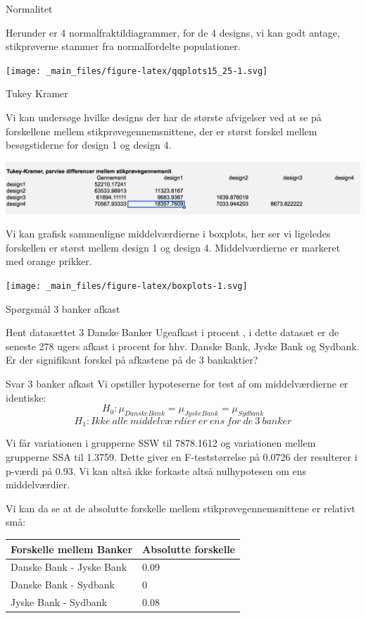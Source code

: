 \documentclass[]{book}
\begin{document}
Normalitet

Herunder er 4 normalfraktildiagrammer, for de 4 designs, vi kan godt antage, stikprøverne stammer fra normalfordelte populationer.

\texttt{[image: \_main\_files/figure-latex/qqplots15\_25-1.svg]}

Tukey Kramer

Vi kan undersøge hvilke designs der har de største afvigelser ved at se på forskellene mellem stikprøvegennemsnittene, der er størst forskel mellem besøgstiderne for design 1 og design 4.

\includegraphics{img/Tukeykramer.png}

Vi kan grafisk sammenligne middelværdierne i boxplots, her ser vi ligeledes forskellen er størst mellem design 1 og design 4. Middelværdierne er markeret med orange prikker.

\texttt{[image: \_main\_files/figure-latex/boxplots-1.svg]}

Spørgsmål 3 banker afkast

Hent datasættet 3 Danske Banker Ugeafkast i procent
, i dette datasæt er de seneste 278 ugers afkast i procent for hhv. Danske Bank, Jyske Bank og Sydbank. Er der signifikant forskel på afkastene på de 3 bankaktier?

Svar 3 banker afkast
Vi opstiller hypoteserne for test af om middelværdierne er identiske:
\[H_0:\mu_{Danske Bank}=\mu_{Jyske Bank}=\mu_{Sydbank}\]\[H_1:Ikke\ alle\ middelvæ\ rdier\ er\ ens\ for\ de\ 3\ banker\]

Vi får variationen i grupperne SSW til 7878.1612 og variationen mellem grupperne SSA til 1.3759. Dette giver en F-teststørrelse på 0.0726 der resulterer i p-værdi på 0.93. Vi kan altså ikke forkaste altså nulhypotesen om ens middelværdier.

Vi kan da se at de absolutte forskelle mellem stikprøvegennemsnittene er relativt små:

\begin{longtable}[]{@{}ll@{}}
\toprule
Forskelle mellem Banker & Absolutte forskelle\tabularnewline
\midrule
\endhead
Danske Bank - Jyske Bank & 0.09\tabularnewline
Danske Bank - Sydbank & 0\tabularnewline
Jyske Bank - Sydbank & 0.08\tabularnewline
\bottomrule
\end{longtable}
\end{document}
